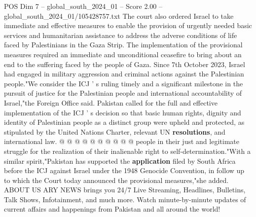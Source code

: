 \begin{textsample}{POS Dim 7 – global\_south\_2024\_01 – Score 2.00 – global\_south\_2024\_01/105428757.txt}
The court also ordered Israel to take immediate and effective measures to enable the provision of urgently needed basic services and humanitarian assistance to address the adverse conditions of life faced by Palestinians in the Gaza Strip.
The implementation of the provisional measures required an immediate and unconditional ceasefire to bring about an end to the suffering faced by the people of Gaza.
Since 7th October 2023, Israel had engaged in military aggression and criminal actions against the Palestinian people."We consider the ICJ ' s ruling timely and a significant milestone in the pursuit of justice for the Palestinian people and international accountability of Israel,"the Foreign Office said.
Pakistan called for the full and effective implementation of the ICJ ' s decision so that basic human rights, dignity and identity of Palestinian people as a distinct group were upheld and protected, as stipulated by the United Nations Charter, relevant UN \textbf{resolutions}, and international law. @ @ @ @ @ @ @ @ @ @ people in their just and legitimate struggle for the realization of their inalienable right to self-determination."With a similar spirit,"Pakistan has supported the \textbf{application} filed by South Africa before the ICJ against Israel under the 1948 Genocide Convention, in follow up to which the Court today announced the provisional measures,"she added.
ABOUT US ARY NEWS brings you 24/7 Live Streaming, Headlines, Bulletins, Talk Shows, Infotainment, and much more.
Watch minute-by-minute updates of current affairs and happenings from Pakistan and all around the world!

\end{textsample}
